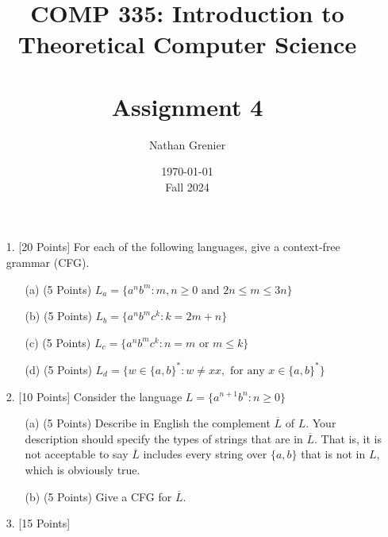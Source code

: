 \documentclass[12pt]{article}
\title{COMP 335: Introduction to Theoretical Computer Science\\
\ \\
Assignment 4}
\author{Nathan Grenier}
\date{\today \\ Fall 2024}
\begin{document}
\begin{spacing}{1.5}
      \maketitle

      \newpage

      \begin{enumerate}

            \item[1.] [20 Points] For each of the following languages, give a context-free grammar (CFG).

                  \begin{enumerate}
                        \item[(a)] (5 Points) $L_a = \{a^nb^m : m,n \geq 0 \text{ and } 2n \leq m \leq 3n \}$


                        \item[(b)] (5 Points) $L_b = \{a^nb^mc^k : k=2m+n \}$


                        \item[(c)] (5 Points) $L_c = \{a^nb^mc^k : n=m \text{ or } m \leq k \}$


                        \item[(d)] (5 Points) $L_d = \{w \in \{a,b\}^* : w \neq xx, \text{ for any } x \in \{a,b\}^* \}$



                  \end{enumerate}

                  \newpage
            \item[2.] [10 Points] Consider the language $L=\{a^{n+1}b^n : n \geq 0 \}$

                  \begin{enumerate}
                        \item[(a)] (5 Points) Describe in English the complement $\overline{L}$ of $L$. Your description should specify the types of strings that are in $\overline{L}$. That is, it is not acceptable to say $\overline{L}$ includes every string over $\{a,b \}$ that is not in $L$, which is obviously true.


                        \item[(b)] (5 Points) Give a CFG for $\overline{L}$.


                  \end{enumerate}

                  \newpage
            \item[3.] [15 Points]


\end{enumerate}
\end{spacing}
\end{document}
